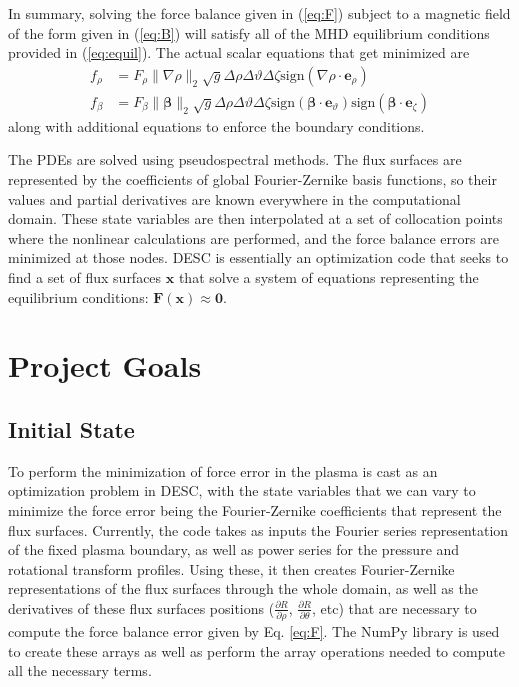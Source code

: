 \documentclass{article}
\newcommand{\er}{{\mathbf e}_{\rho}}
\newcommand{\ev}{{\mathbf e}_{\vartheta}}
\newcommand{\ez}{{\mathbf e}_{\zeta}}
\begin{document}
In summary, solving the force balance given in (\ref{eq:F}) subject to a magnetic field of the form given in (\ref{eq:B}) will satisfy all of the MHD equilibrium conditions provided in (\ref{eq:equil}).
The actual scalar equations that get minimized are
%
\begin{subequations}
  \begin{align}
    f_\rho &= F_\rho \lVert\nabla\rho\rVert_2 \sqrt{g} \Delta\rho\Delta\vartheta\Delta\zeta \text{sign}\left(\nabla\rho\cdot\er\right) \\
    f_\beta &= F_\beta \lVert\mathbf{\beta}\rVert_2 \sqrt{g} \Delta\rho\Delta\vartheta\Delta\zeta \text{sign}\left(\mathbf{\beta}\cdot\ev\right) \text{sign}\left(\mathbf{\beta}\cdot\ez\right)
  \end{align}
\end{subequations}
%
along with additional equations to enforce the boundary conditions.

The PDEs are solved using pseudospectral methods.
The flux surfaces are represented by the coefficients of global Fourier-Zernike basis functions, so their values and partial derivatives are known everywhere in the computational domain.
These state variables are then interpolated at a set of collocation points where the nonlinear calculations are performed, and the force balance errors are minimized at those nodes.
DESC is essentially an optimization code that seeks to find a set of flux surfaces $\mathbf{x}$ that solve a system of equations representing the equilibrium conditions: $\mathbf{F}(\mathbf{x}) \approx \mathbf{0}$.

\section{Project Goals}

\subsection{Initial State}

To perform the minimization of force error in the plasma is cast as an optimization problem in DESC, with the state variables that we can vary to minimize the force error being the Fourier-Zernike coefficients that represent the flux surfaces.
Currently, the code takes as inputs the Fourier series representation of the fixed plasma boundary, as well as power series for the pressure and rotational transform profiles.
Using these, it then creates Fourier-Zernike representations of the flux surfaces through the whole domain, as well as the derivatives of these flux surfaces positions ($\frac{\partial R}{\partial \rho}$, $\frac{\partial R}{\partial \theta}$, etc) that are necessary to compute the force balance error given by Eq. \eqref{eq:F}.
The NumPy \cite{NumPy} library is used to create these arrays as well as perform the array operations needed to compute all the necessary terms.
\end{document}
